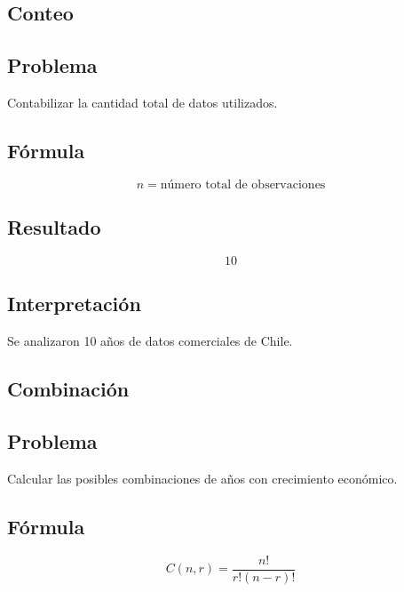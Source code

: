 \documentclass[12pt]{article}
\begin{document}

\subsection{Conteo}

\subsection*{Problema}

Contabilizar la cantidad total de datos utilizados.

\subsection*{Fórmula}

\[
n = \text{número total de observaciones}
\]

\subsection*{Resultado}

\[
10
\]

\subsection*{Interpretación}

Se analizaron 10 años de datos comerciales de Chile.


\subsection{Combinación}

\subsection*{Problema}

Calcular las posibles combinaciones de años con crecimiento económico.

\subsection*{Fórmula}

\[
C(n,r)=\frac{n!}{r!(n-r)!}
\]
\end{document}
